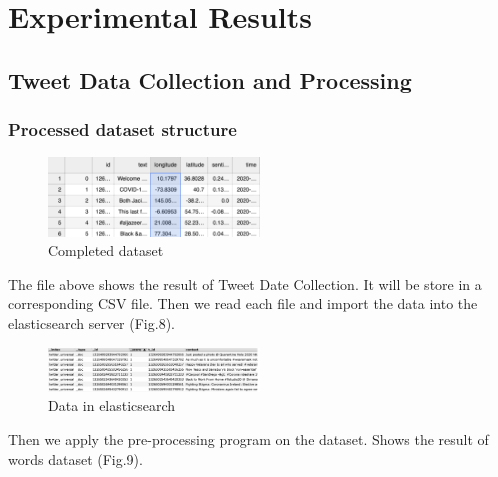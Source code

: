 \section{Experimental Results}
\subsection{Tweet Data Collection and Processing}
\subsubsection{Processed dataset structure}
\begin{figure}[h]
\centering
\includegraphics[width=0.5\textwidth]{imgs/tweets structure.png}
\caption{\label{fig:Research process}Completed dataset}
\end{figure}
The file above  shows the result of Tweet Date Collection. It will be store in
a corresponding CSV file. Then we read each file and import the data into the
elasticsearch server (Fig.8).
\begin{figure}[h]
\centering
\includegraphics[width=0.5\textwidth]{imgs/es_result.png}
\caption{\label{fig:Research process}Data in elasticsearch}
\end{figure}
Then we apply the pre-processing program on the dataset. Shows the result of words dataset (Fig.9). 

